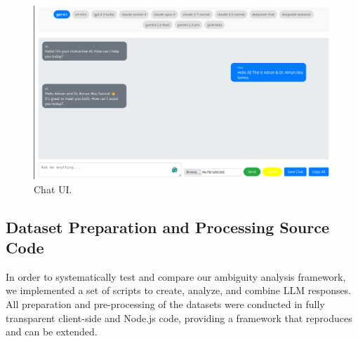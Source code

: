 \documentclass[conference]{IEEEtran}
\begin{document}
\begin{figure}[!t]
\centering
\includegraphics[width=\columnwidth]{images/Figure2.jpeg}
\caption{Chat UI.}
\label{fig_chatui}
\end{figure}


\subsection{Dataset Preparation and Processing Source Code}
In order to systematically test and compare our ambiguity analysis framework, we implemented a set of scripts to create, analyze, and combine LLM responses. All preparation and pre-processing of the datasets were conducted in fully transparent client-side and Node.js code, providing a framework that reproduces and can be extended.
\end{document}
